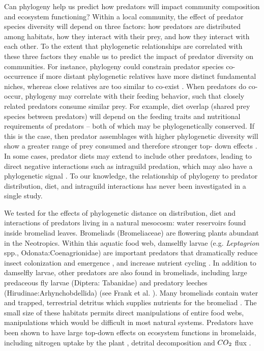 Can
phylogeny help us predict how predators will impact community composition and ecosystem functioning? Within a local community, the effect of predator species diversity will
depend on three factors: how predators are distributed among habitats,
how they interact with their prey, and how they interact with each other. To the extent that phylogenetic relationships are
correlated with these three factors they enable us to predict the impact
of predator diversity on communities. For instance, phylogeny could
constrain predator species co-occurrence if more distant phylogenetic
relatives have more distinct fundamental niches, whereas close relatives
are too similar to co-exist \citep{Webb2002, Emerson2008}. When
predators do co-occur, phylogeny may correlate with their feeding
behavior, such that closely related predators consume similar prey. For
example, diet overlap (shared prey species between predators) will
depend on the feeding traits and nutritional requirements of predators
-- both of which may be phylogenetically conserved. If this is the case,
then predator assemblages with higher phylogenetic diversity will show a
greater range of prey consumed and therefore stronger top- down effects
\citep{Finke2008a}. In some cases, predator diets may extend to include
other predators, leading to direct negative interactions such as
intraguild predation, which may also have a phylogenetic signal
\citep{Pfennig2000}. To our knowledge, the relationship of phylogeny to
predator distribution, diet, and intraguild interactions has never been
investigated in a single study.

We tested for the effects of phylogenetic distance on distribution, diet
and interactions of predators living in a natural mesocosm: water
reservoirs found inside bromeliad leaves. Bromeliads (Bromeliaceae) are
flowering plants abundant in the Neotropics. Within this aquatic food
web, damselfly larvae (e.g. \emph{Leptagrion} spp.,
Odonata:Coenagrionidae) are important predators that dramatically reduce
insect colonization \citep{Hammill2015} and emergence
\citep{Starzomski2010}, and increase nutrient cycling \citep{Ngai2006}.
In addition to damselfly larvae, other predators are also found in
bromeliads, including large predaceous fly larvae (Diptera: Tabanidae)
and predatory leeches (Hirudinae:Arhynchobdellida) (see Frank et al.
\citeyearpar{Frank2009}). Many bromeliads contain water and trapped,
terrestrial detritus which supplies nutrients for the bromeliad
\citep{Reich2003a}. The small size of these habitats permits direct
manipulations of entire food webs, manipulations which would be
difficult in most natural systems. Predators have been shown to have
large top-down effects on ecosystem functions in bromelaids, including
nitrogen uptake by the plant \citep{Ngai2006}, detrital decomposition
and $CO\textsubscript{2}$ flux \citep{Atwood2014, Atwood2013}.

